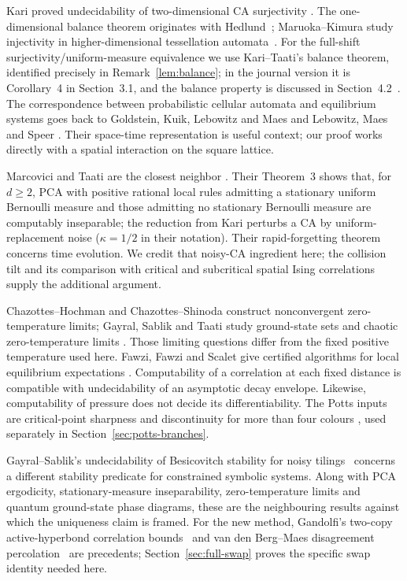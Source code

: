 Kari proved undecidability of two-dimensional CA surjectivity \cite{Kari}. The one-dimensional balance theorem originates with Hedlund~\cite{Hedlund}; Maruoka--Kimura study injectivity in higher-dimensional tessellation automata~\cite{MK76}. For the full-shift surjectivity/uniform-measure equivalence we use Kari--Taati's balance theorem, identified precisely in Remark~\ref{lem:balance}; in the journal version it is Corollary~4 in Section~3.1, and the balance property is discussed in Section~4.2~\cite{KT}. The correspondence between probabilistic cellular automata and equilibrium systems goes back to Goldstein, Kuik, Lebowitz and Maes \cite[Section 2, unnumbered Theorem]{GKLM} and Lebowitz, Maes and Speer \cite[Section 1]{LMS}. Their space-time representation is useful context; our proof works directly with a spatial interaction on the square lattice.

Marcovici and Taati are the closest neighbor \cite{MT}. Their Theorem~3 shows that, for $d\ge2$, PCA with positive rational local rules admitting a stationary uniform Bernoulli measure and those admitting no stationary Bernoulli measure are computably inseparable; the reduction from Kari perturbs a CA by uniform-replacement noise ($\kappa=1/2$ in their notation). Their rapid-forgetting theorem concerns time evolution. We credit that noisy-CA ingredient here; the collision tilt and its comparison with critical and subcritical spatial Ising correlations supply the additional argument.

Chazottes--Hochman \cite[Theorem 1.2]{CH} and Chazottes--Shinoda \cite[Theorem 1.1]{CS} construct nonconvergent zero-temperature limits; Gayral, Sablik and Taati study ground-state sets and chaotic zero-temperature limits \cite{GST}. Those limiting questions differ from the fixed positive temperature used here. Fawzi, Fawzi and Scalet give certified algorithms for local equilibrium expectations \cite[Theorem 1.1]{FFS}. Computability of a correlation at each fixed distance is compatible with undecidability of an asymptotic decay envelope. Likewise, computability of pressure \cite[Proposition 14]{GST} does not decide its differentiability. The Potts inputs are critical-point sharpness \cite{BDC} and discontinuity for more than four colours \cite{DGHMT}, used separately in Section~\ref{sec:potts-branches}.

Gayral--Sablik's undecidability of Besicovitch stability for noisy tilings~\cite[Theorem 5.11 and Section 6]{GS} concerns a different stability predicate for constrained symbolic systems. Along with PCA ergodicity, stationary-measure inseparability, zero-temperature limits and quantum ground-state phase diagrams, these are the neighbouring results against which the uniqueness claim is framed. For the new method, Gandolfi's two-copy active-hyperbond correlation bounds~\cite[Theorem 3.1 and Corollary 3.2, preprint numbering]{Gandolfi} and van den Berg--Maes disagreement percolation~\cite{vdBM} are precedents; Section~\ref{sec:full-swap} proves the specific swap identity needed here.

